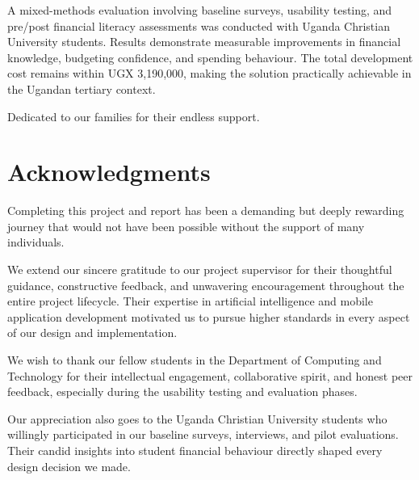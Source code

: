 \documentclass[12pt]{report}
\begin{document}
A mixed-methods evaluation involving baseline surveys, usability testing, and
pre/post financial literacy assessments was conducted with Uganda Christian University
students. Results demonstrate measurable improvements in financial knowledge,
budgeting confidence, and spending behaviour. The total development cost remains
within UGX 3,190,000, making the solution practically achievable in the Ugandan
tertiary context.




Dedicated to our families for their endless support.

\tableofcontents
\listoffigures
\listoftables

\chapter*{Acknowledgments}
\label{pre:06-acknowledgments}

Completing this project and report has been a demanding but deeply rewarding journey
that would not have been possible without the support of many individuals.

We extend our sincere gratitude to our project supervisor for their thoughtful guidance,
constructive feedback, and unwavering encouragement throughout the entire project
lifecycle. Their expertise in artificial intelligence and mobile application development
motivated us to pursue higher standards in every aspect of our design and implementation.

We wish to thank our fellow students in the Department of Computing and Technology
for their intellectual engagement, collaborative spirit, and honest peer feedback,
especially during the usability testing and evaluation phases.

Our appreciation also goes to the Uganda Christian University students who willingly
participated in our baseline surveys, interviews, and pilot evaluations. Their candid
insights into student financial behaviour directly shaped every design decision we made.
\end{document}

